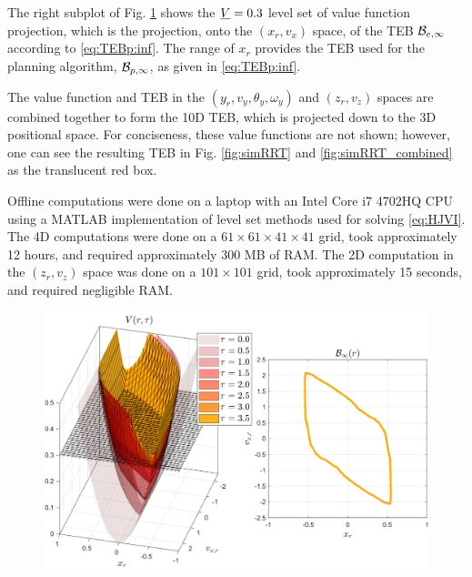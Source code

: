The right subplot of Fig. \ref{fig:valfuncRRT} shows the $\underline{V} = 0.3$ level set of value function projection, which is the projection, onto the $(x_r, v_x)$ space, of the TEB $\mathcal B_{e, \infty}$ according to \eqref{eq:TEBp:inf}.
The range of $x_r$ provides the TEB used for the planning algorithm, $\mathcal B_{p, \infty}$, as given in \eqref{eq:TEBp:inf}.

The value function and TEB in the $(y_r, v_y, \theta_y, \omega_y)$ and $(z_r, v_z)$ spaces are combined together to form the 10D TEB, which is projected down to the 3D positional space.
For conciseness, these value functions are not shown; however, one can see the resulting TEB in Fig. \ref{fig:simRRT} and \ref{fig:simRRT_combined} as the translucent red box.

Offline computations were done on a laptop with an Intel Core i7 4702HQ CPU using a MATLAB implementation of level set methods \cite{Mitchell07c} used for solving \eqref{eq:HJVI}.
The 4D computations were done on a $61\times 61 \times 41 \times 41$ grid, took approximately 12 hours, and required approximately 300 MB of RAM.
The 2D computation in the $(z_r, v_z)$ space was done on a $101 \times 101$ grid, took approximately 15 seconds, and required negligible RAM.

\begin{figure}
  \includegraphics[width=\columnwidth]{fig/Q10D_Q3D/valfunc}
  \caption{}
  \label{fig:valfuncRRT}
\end{figure}

